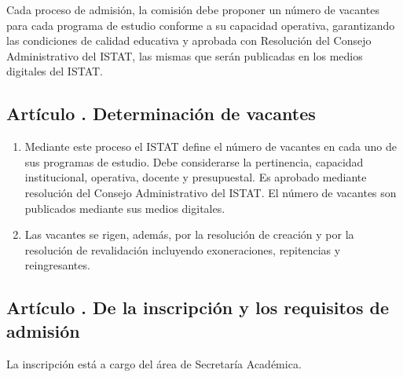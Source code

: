 Cada proceso de admisión, la comisión debe proponer un número de vacantes para cada programa de estudio conforme a su capacidad operativa, garantizando las condiciones de calidad educativa y aprobada con Resolución del Consejo Administrativo del ISTAT, las mismas que serán publicadas en los medios digitales del ISTAT.  
\subsection{Artículo . Determinación de vacantes}
\addtocounter{ns}{1}
\begin{enumerate}
\item Mediante este proceso el ISTAT define el número de vacantes en cada uno de sus programas de estudio. Debe considerarse la pertinencia, capacidad institucional, operativa, docente y presupuestal. Es aprobado mediante resolución del Consejo Administrativo del ISTAT. El número de vacantes son publicados mediante sus medios digitales. 
\item Las vacantes se rigen, además, por la resolución de creación y por la resolución de revalidación incluyendo exoneraciones, repitencias y reingresantes.
\end{enumerate}
\subsection{Artículo . De la inscripción y los requisitos de admisión}
\addtocounter{ns}{1}
La inscripción está a cargo del área de Secretaría Académica. 

